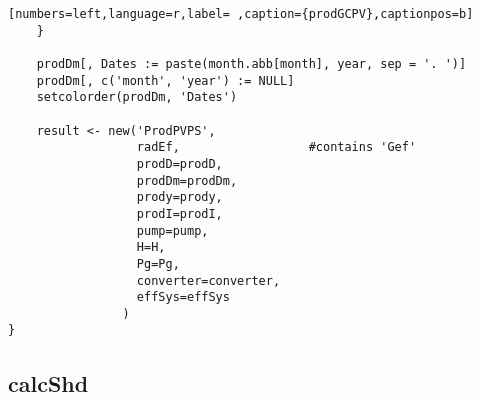 \begin{lstlisting}[numbers=left,language=r,label= ,caption={prodGCPV},captionpos=b]
    }

    prodDm[, Dates := paste(month.abb[month], year, sep = '. ')]
    prodDm[, c('month', 'year') := NULL]
    setcolorder(prodDm, 'Dates')

    result <- new('ProdPVPS',
                  radEf,                  #contains 'Gef'
                  prodD=prodD,
                  prodDm=prodDm,
                  prody=prody,
                  prodI=prodI,
                  pump=pump,
                  H=H,
                  Pg=Pg,
                  converter=converter,
                  effSys=effSys
                )
}
\end{lstlisting}
\subsection{calcShd}
\label{sec:org9b656c2}
\label{subsec:calcShd}
